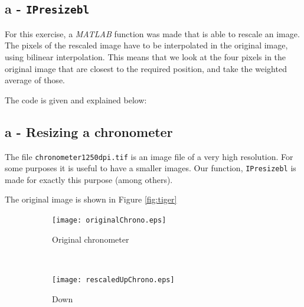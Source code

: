 \subsection*{a - \texttt{IPresizebl}}
For this exercise, a \textit{MATLAB} function was made that is able to rescale an image.
The pixels of the rescaled image have to be interpolated in the original image, using bilinear interpolation.
This means that we look at the four pixels in the original image that are closest to the required position, and take the weighted average of those.

The code is given and explained below:

\subsection*{a - Resizing a chronometer}
The file \texttt{chronometer1250dpi.tif} is an image file of a very high resolution.
For some purposes it is useful to have a smaller images.
Our function, \texttt{IPresizebl} is made for exactly this purpose (among others).

The original image is shown in Figure \ref{fig:tiger}

\begin{figure}
\centering
 \begin{subfigure}[b]{0.45\textwidth}
  \texttt{[image: originalChrono.eps]}
  \caption{Original chronometer}
  \label{fig:chrono_original}
 \end{subfigure}
 ~
 \begin{subfigure}[b]{0.45\textwidth}
  \texttt{[image: rescaledUpChrono.eps]}
  \caption{Down}
  \label{fig:chrono_down_up}
 \end{subfigure}
\caption{}\label{fig:chrono_compare}
\end{figure}

